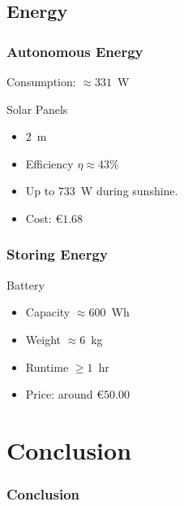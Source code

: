 \documentclass[12pt]{beamer}
\begin{document}
        \subsection{Energy} %
            \begin{frame}
                \frametitle{Autonomous Energy}
                \pause
                Consumption: $\approx331$~W
                \pause
                \begin{block}{Solar Panels}
                    \pause
                    \begin{itemize}
                        \item $2$~m
                        \pause
                        \item Efficiency $\eta\approx43\%{}$
                        \pause
                        \item Up to $733$~W during sunshine.
                        \pause
                        \item Cost: €$1.68$
                    \end{itemize}
                \end{block}
            \end{frame}
            \begin{frame}
                \frametitle{Storing Energy}
                \pause
                \begin{block}{Battery}
                    \pause
                    \begin{itemize}
                        \item Capacity $\approx600$~Wh
                        \pause
                        \item Weight $\approx6$~kg
                        \pause
                        \item Runtime $\geqslant 1$~hr
                        \pause
                        \item Price: around €$50.00$
                    \end{itemize}
                \end{block}
            \end{frame}

    \section{Conclusion} %
        \begin{frame}
            \frametitle{Conclusion}
        \end{frame}
        \printbibliography[title={References}] %
\end{document}
